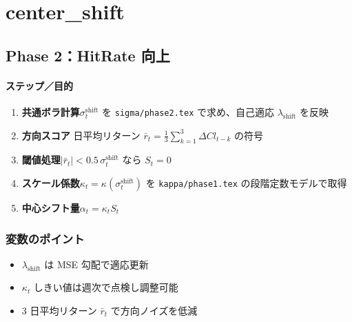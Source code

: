 
\section*{center\_shift}\nopagebreak[4]

\subsection*{Phase 2：HitRate 向上}\nopagebreak[4]
\paragraph{ステップ／目的}
\begin{flushleft}
\begin{enumerate}
  \item \textbf{共通ボラ計算}\;\(\sigma_t^{\text{shift}}\) を
        {\scriptsize\verb|sigma/phase2.tex|} で求め、自己適応
        $\lambda_{\text{shift}}$ を反映
  \item \textbf{方向スコア} 日平均リターン
        \(\bar{r}_t=\tfrac{1}{3}\sum_{k=1}^3 \Delta Cl_{t-k}\) の符号
  \item \textbf{閾値処理}\;$|\bar{r}_t|<0.5\,\sigma_t^{\text{shift}}$ なら
        \(S_t=0\)
  \item \textbf{スケール係数}\;\(\kappa_t=\kappa(\sigma_t^{\text{shift}})\) を
        {\scriptsize\verb|kappa/phase1.tex|} の段階定数モデルで取得
  \item \textbf{中心シフト量}\;\(\alpha_t=\kappa_t S_t\)
\end{enumerate}
\end{flushleft}

\subsubsection*{変数のポイント}
\begin{flushleft}
\begin{itemize}
  \item $\lambda_{\text{shift}}$ は MSE 勾配で適応更新
  \item \(\kappa_t\) しきい値は週次で点検し調整可能
  \item 3 日平均リターン \(\bar{r}_t\) で方向ノイズを低減
\end{itemize}
\end{flushleft}

